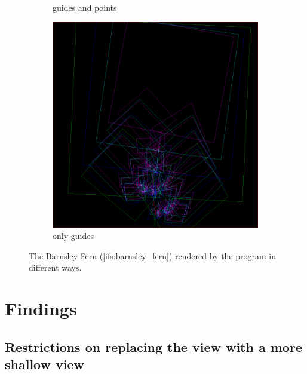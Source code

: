 \documentclass[11pt]{article}
\begin{document}
\begin{figure}
\begin{subfigure}[b]{0.3\textwidth}
         \caption{guides and points}
         \label{figure:barnsley_guides_and_points}
     \end{subfigure}
     \hfill
     \begin{subfigure}[b]{0.3\textwidth}
         \centering
         \includegraphics[width=\textwidth]{figures/barnsley_guides}
         \caption{only guides}
         \label{figure:barnsley_guides}
     \end{subfigure}
        \caption{The Barnsley Fern (\autoref{ifs:barnsley_fern}) rendered by the program in different ways.}
        \label{figure:barnsley_guides_vs_points}
\end{figure}



\section{Findings}
\label{sec:org7531238}
\label{section:findings}

\subsection{Restrictions on replacing the view with a more shallow view}
\label{sec:orgd3d8613}
\label{subsection:jumping_restrictions}
\end{document}
